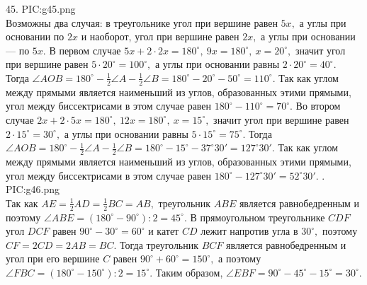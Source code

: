 45. {{PIC:g45.png}}\\
Возможны два случая: в треугольнике угол при вершине равен $5x,$ а углы при основании по $2x$ и наоборот, угол при вершине равен $2x,$ а углы при основании --- по $5x.$ В первом случае $5x+2\cdot2x=180^\circ,\ 9x=180^\circ,\ x=20^\circ,$ значит угол при вершине равен $5\cdot20^\circ=100^\circ,$ а углы при основании равны $2\cdot20^\circ=40^\circ.$ Тогда $\angle AOB=180^\circ-\frac{1}{2}\angle A-\frac{1}{2}\angle B=180^\circ-20^\circ-50^\circ=110^\circ.$ Так как углом между прямыми является наименьший из углов, образованных этими прямыми, угол между биссектрисами в этом случае равен $180^\circ-110^\circ=70^\circ.$ Во втором случае $2x+2\cdot5x=180^\circ,\ 12x=180^\circ,\ x=15^\circ,$ значит угол при вершине равен $2\cdot15^\circ=30^\circ,$ а углы при основании равны $5\cdot15^\circ=75^\circ.$
Тогда $\angle AOB=180^\circ-\frac{1}{2}\angle A-\frac{1}{2}\angle B=180^\circ-15^\circ-37^\circ30'=127^\circ30'.$ Так как углом между прямыми является наименьший из углов, образованных этими прямыми, угол между биссектрисами в этом случае равен $180^\circ-127^\circ30'=52^\circ30'.$\newpage
{}. {{PIC:g46.png}}\\
Так как $AE=\frac{1}{2}AD=\frac{1}{2}BC=AB,$ треугольник $ABE$ является равнобедренным и поэтому $\angle ABE=(180^\circ-90^\circ):2=45^\circ.$ В прямоугольном треугольнике $CDF$ угол $DCF$ равен $90^\circ-30^\circ=60^\circ$ и катет $CD$ лежит напротив угла в $30^\circ,$ поэтому $CF=2CD=2AB=BC.$ Тогда треугольник $BCF$ является равнобедренным и угол при его вершине $C$ равен $90^\circ+60^\circ=150^\circ,$ а поэтому $\angle FBC=(180^\circ-150^\circ):2=15^\circ.$ Таким образом, $\angle EBF=90^\circ-45^\circ-15^\circ=30^\circ.$\\
